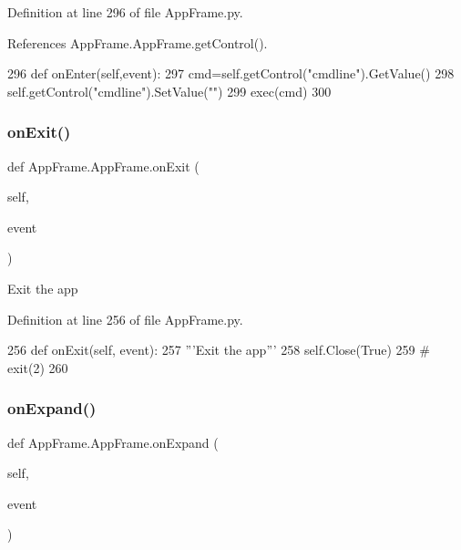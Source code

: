 Definition at line 296 of file App\+Frame.\+py.



References App\+Frame.\+App\+Frame.\+get\+Control().


\begin{DoxyCode}
296     \textcolor{keyword}{def }onEnter(self,event):
297         cmd=self.getControl(\textcolor{stringliteral}{"cmdline"}).GetValue()
298         self.getControl(\textcolor{stringliteral}{"cmdline"}).SetValue(\textcolor{stringliteral}{""}) 
299         exec(cmd)
300  
\end{DoxyCode}
\mbox{\label{classAppFrame_1_1AppFrame_a27e6061a0b781a7af1c3a813da24a0a3}} 
\subsubsection{\texorpdfstring{on\+Exit()}{onExit()}}
{\footnotesize\ttfamily def App\+Frame.\+App\+Frame.\+on\+Exit (\begin{DoxyParamCaption}\item[{}]{self,  }\item[{}]{event }\end{DoxyParamCaption})}

\begin{DoxyVerb}Exit the app\end{DoxyVerb}
 

Definition at line 256 of file App\+Frame.\+py.


\begin{DoxyCode}
256     \textcolor{keyword}{def }onExit(self, event):
257         \textcolor{stringliteral}{'''Exit the app'''}
258         self.Close(\textcolor{keyword}{True})
259 \textcolor{comment}{#        exit(2)}
260 
\end{DoxyCode}
\mbox{\label{classAppFrame_1_1AppFrame_a3edd90a5c52b1be8d12d3536c800f0c9}} 
\subsubsection{\texorpdfstring{on\+Expand()}{onExpand()}}
{\footnotesize\ttfamily def App\+Frame.\+App\+Frame.\+on\+Expand (\begin{DoxyParamCaption}\item[{}]{self,  }\item[{}]{event }\end{DoxyParamCaption})}



